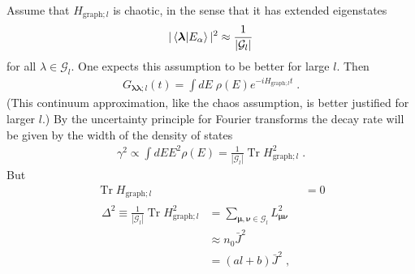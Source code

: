 \documentclass[aps,prb,nofootinbib,twocolumn,balancelastpage,amsmath,amssymb,floatfix,superscriptaddress,]{revtex4-1}
\newcommand{\tr}{\operatorname{Tr}}
\newcommand{\graph}{\mathrm{graph}}
\newcommand{\pool}{\mathcal G}
\begin{document}
Assume that $H_{\graph;l}$ is chaotic, in the sense that it has extended eigenstates
\begin{align}
  \label{eq:chaos}
  |\braket {\bm \lambda| E_\alpha}|^2 \approx \frac 1 {| \pool_l|}
\end{align}
for all $\lambda \in \pool_l$.
One expects this assumption to be better for large $l$.
Then
\begin{align}
  \label{eq:ret-ampl}
  G_{\bm\lambda\bm\lambda;l}(t) = \int dE\; \rho(E) e^{-iH_{\graph;l} t} \;.
\end{align}
(This continuum approximation, like the chaos assumption, is better justified for larger $l$.)
By the uncertainty principle for Fourier transforms the decay rate will be given by the width of the density of states
\begin{align}
  \gamma^2 \propto \int dE E^2 \rho(E) = \frac 1 {|\pool_l|} \tr H_{\graph;l}^2 \;.
\end{align}
But
\begin{subequations}
  \begin{align}
    \tr H_{\graph;l} &= 0 \\
    \label{eq:trH2}
    \begin{split}
     \Delta^2 \equiv \frac 1 {|\pool_l|} \tr H_{\graph;l}^2 &= \sum_{\bm \mu, \bm \nu \in \pool_l} L_{\bm\mu\bm\nu}^2\\
                     &\approx n_0 \bar J^2 \\
                     &= (al + b) \bar J^2\;,
                   \end{split}
  \end{align}
\end{subequations}
\end{document}
